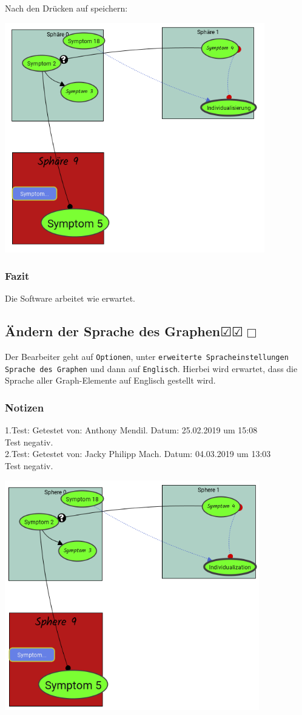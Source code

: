 \documentclass[enabledeprecatedfontcommands]{scrartcl}
\newcommand{\subsectiont}[2]{\subsection[#1]{#1{\normalsize\normalfont #2}}}
\newcommand{\leer}{$\Box$}
\newcommand{\ok}{$\CheckedBox$}
\begin{document}
Nach den Drücken auf speichern:
\begin{center}
\includegraphics[height=10cm]{3_44speichern.PNG}
\end{center}
\subsubsection{Fazit}
Die Software arbeitet wie erwartet.

\subsectiont{Ändern der Sprache des Graphen}{\dotfill\ok\ok\leer}
Der Bearbeiter geht auf \texttt{Optionen}, unter \texttt{erweiterte Spracheinstellungen} \texttt{Sprache des Graphen} und dann auf \texttt{Englisch}. Hierbei wird erwartet, dass die Sprache aller Graph-Elemente auf Englisch gestellt wird.
\subsubsection{Notizen}
1.Test: Getestet von: Anthony Mendil. Datum: 25.02.2019 um 15:08 \\
Test negativ. \\
2.Test: Getestet von: Jacky Philipp Mach. Datum: 04.03.2019 um 13:03 \\
Test negativ.
\begin{center}
\includegraphics[height=10cm]{3_45.PNG}
\end{center}
\end{document}
